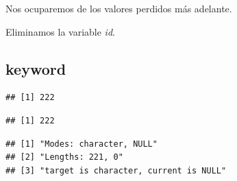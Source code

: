 \documentclass[
]{article}
\newenvironment{Shaded}{\begin{snugshade}}{\end{snugshade}}
\newcommand{\KeywordTok}[1]{\textcolor[rgb]{0.13,0.29,0.53}{\textbf{#1}}}
\newcommand{\NormalTok}[1]{#1}
\newcommand{\OperatorTok}[1]{\textcolor[rgb]{0.81,0.36,0.00}{\textbf{#1}}}
\newcommand{\OtherTok}[1]{\textcolor[rgb]{0.56,0.35,0.01}{#1}}
\newcommand{\StringTok}[1]{\textcolor[rgb]{0.31,0.60,0.02}{#1}}
\begin{document}
Nos ocuparemos de los valores perdidos más adelante.

Eliminamos la variable \emph{id}.

\begin{Shaded}
\end{Shaded}

\hypertarget{keyword}{%
\subsection{keyword}\label{keyword}}

\begin{Shaded}
\end{Shaded}

\begin{verbatim}
## [1] 222
\end{verbatim}

\begin{Shaded}
\end{Shaded}

\begin{verbatim}
## [1] 222
\end{verbatim}

\begin{Shaded}
\end{Shaded}

\begin{verbatim}
## [1] "Modes: character, NULL"              
## [2] "Lengths: 221, 0"                     
## [3] "target is character, current is NULL"
\end{verbatim}
\end{document}
